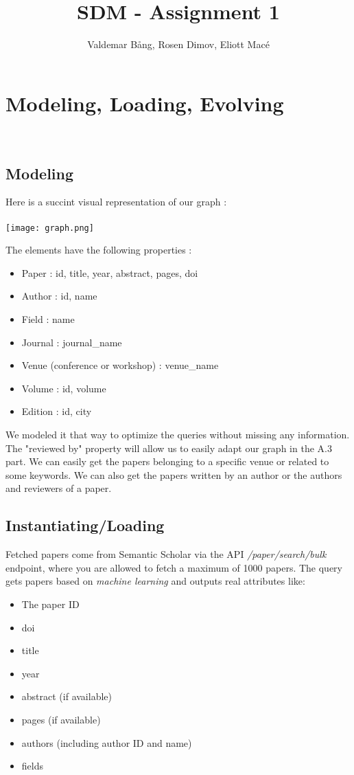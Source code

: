 \documentclass{article}
\title{SDM - Assignment 1}
\author{Valdemar Bång, Rosen Dimov, Eliott Macé}
\begin{document}
\maketitle

\section{Modeling, Loading, Evolving} \

\subsection{Modeling}

Here is a succint visual representation of our graph : \\\\
\texttt{[image: graph.png]}

The elements have the following properties : 

\begin{itemize}
    \item Paper : id, title, year, abstract, pages, doi
    \item Author : id, name
    \item Field : name
    \item Journal : journal\_name
    \item Venue (conference or workshop) : venue\_name
    \item Volume : id, volume
    \item Edition : id, city
\end{itemize}

We modeled it that way to optimize the queries without missing any information. The "reviewed by" property will allow us to easily adapt our graph in the A.3 part. We can easily get the papers belonging to a specific venue or related to some keywords. We can also get the papers written by an author or the authors and reviewers of a paper.

\subsection{Instantiating/Loading}
Fetched papers come from Semantic Scholar via the API \textit{/paper/search/bulk} endpoint, where you are allowed to fetch a maximum of 1000 papers. The query gets papers based on \textit{machine learning} and outputs real attributes like:
\begin{itemize}
    \item The paper ID
    \item doi
    \item title
    \item year
    \item abstract (if available)
    \item pages (if available) 
    \item authors (including author ID and name)
    \item fields
\end{itemize}
\end{document}
